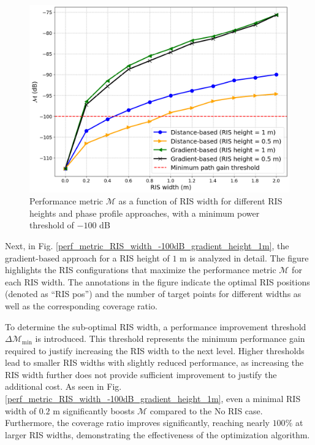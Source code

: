 \documentclass{IEEEoj}
\begin{document}
\begin{figure}
	\centering
	\includegraphics[width=\linewidth]{Sim_Results/perf_metric_RIS_width_multiple_curves_-100dB.png}
	\caption{Performance metric $\mathcal{M}$ as a function of RIS width for different RIS heights and phase profile approaches, with a minimum power threshold of $-100$ dB}
	\label{perf_metric_RIS_width_multiple_curves_-100dB}
\end{figure}

Next, in Fig. \ref{perf_metric_RIS_width_-100dB_gradient_height_1m}, the gradient-based approach for a RIS height of $1$ m is analyzed in detail. The figure highlights the RIS configurations that maximize the performance metric $\mathcal{M}$ for each RIS width. The annotations in the figure indicate the optimal RIS positions (denoted as “RIS pos”) and the number of target points for different widths as well as the corresponding coverage ratio. 

To determine the sub-optimal RIS width, a performance improvement threshold $\Delta \mathcal{M}_{\text{min}}$ is introduced. This threshold represents the minimum performance gain required to justify increasing the RIS width to the next level. Higher thresholds lead to smaller RIS widths with slightly reduced performance, as increasing the RIS width further does not provide sufficient improvement to justify the additional cost. As seen in Fig. \ref{perf_metric_RIS_width_-100dB_gradient_height_1m}, even a minimal RIS width of $0.2$ m significantly boosts $\mathcal{M}$ compared to the No RIS case. Furthermore, the coverage ratio improves significantly, reaching nearly $100\%$ at larger RIS widths, demonstrating the effectiveness of the optimization algorithm.
\end{document}
